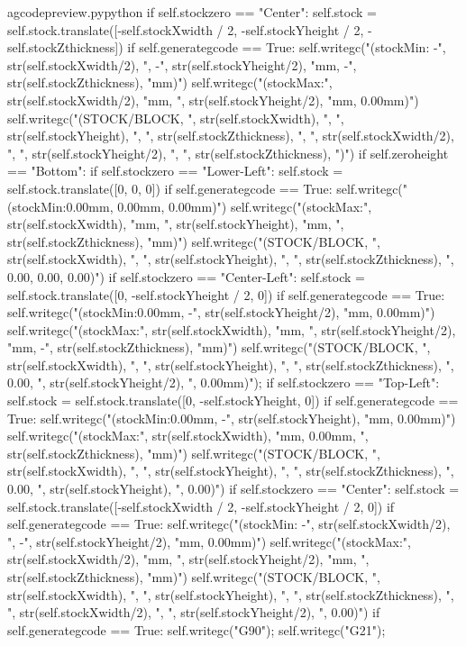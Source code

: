 \documentclass{ltxdoc}
\begin{document}
\begin{writecode}{a}{gcodepreview.py}{python}
            if self.stockzero == "Center":
                self.stock = self.stock.translate([-self.stockXwidth / 2, -self.stockYheight / 2, -self.stockZthickness])
                if self.generategcode == True:
                    self.writegc("(stockMin: -", str(self.stockXwidth/2), ", -", str(self.stockYheight/2), "mm, -", str(self.stockZthickness), "mm)")
                    self.writegc("(stockMax:", str(self.stockXwidth/2), "mm, ", str(self.stockYheight/2), "mm, 0.00mm)")
                    self.writegc("(STOCK/BLOCK, ", str(self.stockXwidth), ", ", str(self.stockYheight), ", ", str(self.stockZthickness), ", ", str(self.stockXwidth/2), ", ", str(self.stockYheight/2), ", ", str(self.stockZthickness), ")")
        if self.zeroheight == "Bottom":
            if self.stockzero == "Lower-Left":
                 self.stock = self.stock.translate([0, 0, 0])
                 if self.generategcode == True:
                     self.writegc("(stockMin:0.00mm, 0.00mm, 0.00mm)")
                     self.writegc("(stockMax:", str(self.stockXwidth), "mm, ", str(self.stockYheight), "mm, ", str(self.stockZthickness), "mm)")
                     self.writegc("(STOCK/BLOCK, ", str(self.stockXwidth), ", ", str(self.stockYheight), ", ", str(self.stockZthickness), ", 0.00, 0.00, 0.00)")
            if self.stockzero == "Center-Left":
                self.stock = self.stock.translate([0, -self.stockYheight / 2, 0])
                if self.generategcode == True:
                    self.writegc("(stockMin:0.00mm, -", str(self.stockYheight/2), "mm, 0.00mm)")
                    self.writegc("(stockMax:", str(self.stockXwidth), "mm, ", str(self.stockYheight/2), "mm, -", str(self.stockZthickness), "mm)")
                    self.writegc("(STOCK/BLOCK, ", str(self.stockXwidth), ", ", str(self.stockYheight), ", ", str(self.stockZthickness), ", 0.00, ", str(self.stockYheight/2), ", 0.00mm)");
            if self.stockzero == "Top-Left":
                self.stock = self.stock.translate([0, -self.stockYheight, 0])
                if self.generategcode == True:
                    self.writegc("(stockMin:0.00mm, -", str(self.stockYheight), "mm, 0.00mm)")
                    self.writegc("(stockMax:", str(self.stockXwidth), "mm, 0.00mm, ", str(self.stockZthickness), "mm)")
                    self.writegc("(STOCK/BLOCK, ", str(self.stockXwidth), ", ", str(self.stockYheight), ", ", str(self.stockZthickness), ", 0.00, ", str(self.stockYheight), ", 0.00)")
            if self.stockzero == "Center":
                self.stock = self.stock.translate([-self.stockXwidth / 2, -self.stockYheight / 2, 0])
                if self.generategcode == True:
                    self.writegc("(stockMin: -", str(self.stockXwidth/2), ", -", str(self.stockYheight/2), "mm, 0.00mm)")
                    self.writegc("(stockMax:", str(self.stockXwidth/2), "mm, ", str(self.stockYheight/2), "mm, ", str(self.stockZthickness), "mm)")
                    self.writegc("(STOCK/BLOCK, ", str(self.stockXwidth), ", ", str(self.stockYheight), ", ", str(self.stockZthickness), ", ", str(self.stockXwidth/2), ", ", str(self.stockYheight/2), ", 0.00)")
        if self.generategcode == True:
            self.writegc("G90");
            self.writegc("G21");

\end{writecode}
\end{document}
